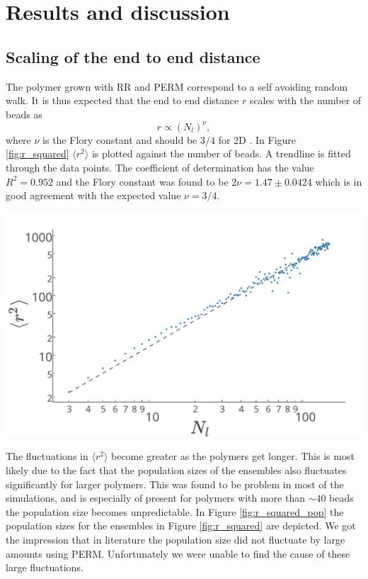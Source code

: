 \section{Results and discussion}

\subsection{Scaling of the end to end distance}
The polymer grown with RR and PERM correspond to a self avoiding random walk. It is thus expected that the end to end distance $r$ scales with the number of beads as 
\begin{equation*}
    r \propto \left(N_l\right)^\nu,
\end{equation*} where $\nu$ is the Flory constant and should be $3/4$ for 2D \cite{jmt}. In Figure \ref{fig:r_squared} $\langle r^2\rangle$ is plotted against the number of beads. A trendline is fitted through the data points. The coefficient of determination has the value $R^2 = 0.952$ and the Flory constant was found to be $2\nu = 1.47 \pm 0.0424$ which is in good agreement with the expected value $\nu=3/4$.  
\begin{Figure}
    \centering
    \includegraphics[width=\linewidth]{r_squared.pdf}
    \label{fig:r_squared}
\end{Figure}

The fluctuations in $\langle r^2\rangle$  become greater as the polymers get longer. This is most likely due to the fact that the population sizes of the ensembles also fluctuates significantly for larger polymers. This was found to be problem in most of the simulations, and is especially of present for polymers with more than $\sim 40$ beads the population size becomes unpredictable. In Figure \ref{fig:r_squared_pop} the population sizes for the ensembles in Figure \ref{fig:r_squared} are depicted. We got the impression that in literature the population size did not fluctuate by large amounts using PERM. Unfortunately we were unable to find the cause of these large fluctuations.

